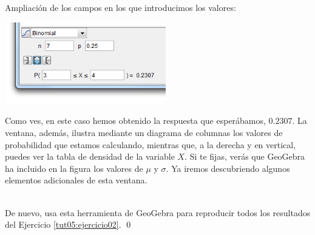\documentclass[10pt,a4paper]{article}\usepackage[]{graphicx}\usepackage[]{color}
\begin{document}
Ampliación de los campos en los que introducimos los valores:
\begin{center}
    \includegraphics[width=7cm]{../fig/Tut05-27.png}
\end{center}
Como ves, en este caso hemos obtenido la respuesta que esperábamos, $0.2307$. La ventana, además, ilustra mediante un diagrama de columnas los valores de probabilidad que estamos calculando, mientras que, a la derecha y en vertical, puedes ver la tabla de densidad de la variable $X$. Si te fijas, verás que GeoGebra ha incluido en la figura los valores de $\mu$ y $\sigma$. Ya iremos descubriendo algunos elementos adicionales de esta ventana.

\begin{ejercicio}
\label{tut05:ejercicio10}
\quad\\
De nuevo, usa esta herramienta de GeoGebra para reproducir todos los resultados del Ejercicio \ref{tut05:ejercicio02}.
\qed
\end{ejercicio}
\end{document}
